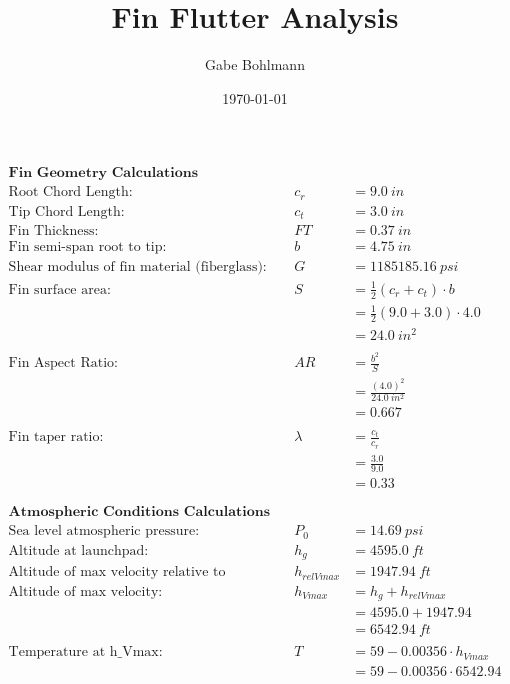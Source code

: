 \documentclass{article}
\title{Fin Flutter Analysis}
\author{Gabe Bohlmann}
\date{\today}
\begin{document}
	\begin{align*}
		\textbf{Fin Geometry Calculations} \\
		\text{Root Chord Length:}& &c_{r} &=\SI{9.0}{in} \\
		\text{Tip Chord Length:}& &c_{t} &= \SI{3.0}{in} \\
		\text{Fin Thickness:}& &FT &= \SI{0.37}{in} \\
		\text{Fin semi-span root to tip:}& &b &= \SI{4.75}{in} \\
		\text{Shear modulus of fin material (fiberglass):}& &G &= \SI{1185185.16}{psi} \\
		\text{Fin surface area:}& &S &= \frac{1}{2} \left( c_{r} + c_{t} \right) \cdot b \tag{eqn. 1} \\
		&& &= \frac{1}{2} \left( 9.0 + 3.0 \right) \cdot4.0\\
		&& &= \SI{24.0}{in^2} \\ \\
		\text{Fin Aspect Ratio:}& &AR &= \frac{b^2}{S} \tag{eqn. 2} \\
		&& &= \frac{\left(4.0\right)^2}{\SI{24.0}{in^2}} \\
		&& &= 0.667\\ \\
		\text{Fin taper ratio:}& &\lambda &= \frac{c_{t}}{c_{r}} \tag{eqn. 3} \\
		&& &= \frac{3.0}{9.0} \\
		&& &= 0.33\\
		\\ \\
		\textbf{Atmospheric Conditions Calculations} \\
		\text{Sea level atmospheric pressure:}& &P_{0} &= \SI{14.69}{psi} \\
		\text{Altitude at launchpad:}& &h_{g} &= \SI{4595.0}{ft} \\
		\text{Altitude of max velocity relative to launchpad:}& &h_{relVmax} &= \SI{1947.94}{ft} \\
		\text{Altitude of max velocity:}& &h_{Vmax} &= h_{g} + h_{relVmax} \\ \tag{eqn.4}
		&& &= 4595.0 + 1947.94 \\
		&& &= \SI{6542.94}{ft} \\ \\
		\text{Temperature at h\_Vmax:}& &T &= 59 - 0.00356 \cdot h_{Vmax} \tag{eqn. 5}\\
		&& &= 59 - 0.00356 \cdot 6542.94\\

\end{align*}
\end{document}
